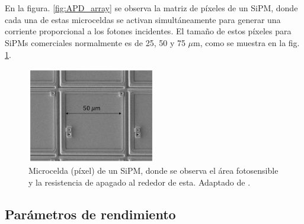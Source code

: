 \\ \\
En la figura. \ref{fig:APD_array} se observa la matriz de píxeles de un SiPM, donde cada una de estas microceldas se activan simultáneamente para generar una corriente proporcional a los fotones incidentes. El tamaño de estos píxeles para SiPMs comerciales normalmente es de 25, 50 y 75 $\mu$m, como se muestra en la fig. \ref{fig:APD_pitch}.     
\begin{figure}[h!]
\begin{centering}
  \includegraphics[width=0.5\textwidth]{Images/SiPM_pixel.PNG}
    \caption{Microcelda (píxel) de un SiPM, donde se observa el área fotosensible y la resistencia de apagado al rededor de esta. Adaptado de \citep{MPPC_note}.}
    \label{fig:APD_pitch}  
  \par\end{centering}
\end{figure}

\subsection{Parámetros de rendimiento}
